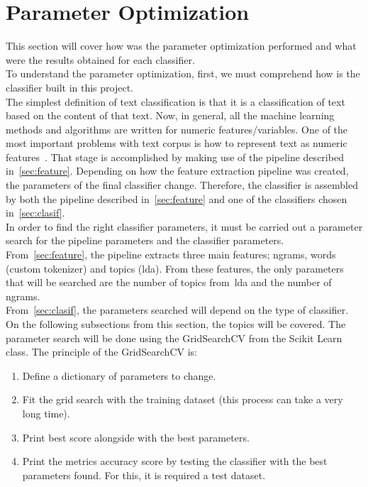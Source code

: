 \section{Parameter Optimization}
This section will cover how was the parameter optimization performed and what were the results obtained for each classifier.\\
To understand the parameter optimization, first, we must comprehend how is the classifier built in this project.\\
The simplest definition of text classification is that it is a classification of text based on the content of that text. Now, in general, all the machine learning methods and algorithms are written for numeric features/variables. One of the most important problems with text corpus is how to represent text as numeric features~\cite{nltk}. That stage is accomplished by making use of the pipeline described in~\cref{sec:feature}. Depending on how the feature extraction pipeline was created, the parameters of the final classifier change. Therefore, the classifier is assembled by both the pipeline described in~\cref{sec:feature} and one of the classifiers chosen in~\cref{sec:clasif}.\\
In order to find the right classifier parameters, it must be carried out a parameter search for the pipeline parameters and the classifier parameters.\\
From~\cref{sec:feature}, the pipeline extracts three main features; ngrams, words (custom tokenizer) and topics (\ac{lda}). From these features, the only parameters that will be searched are the number of topics from~\ac{lda} and the number of ngrams.\\
From~\cref{sec:clasif}, the parameters searched will depend on the type of classifier. On the following subsections from this section, the topics will be covered.
The parameter search will be done using the GridSearchCV from the Scikit Learn class. The principle of the GridSearchCV is:
\begin{enumerate}
	\item Define a dictionary of parameters to change.
	\item Fit the grid search with the training dataset (this process can take a very long time).
	\item Print best score alongside with the best parameters.
	\item Print the metrics accuracy score by testing the classifier with the best parameters found. For this, it is required a test dataset.
\end{enumerate}
